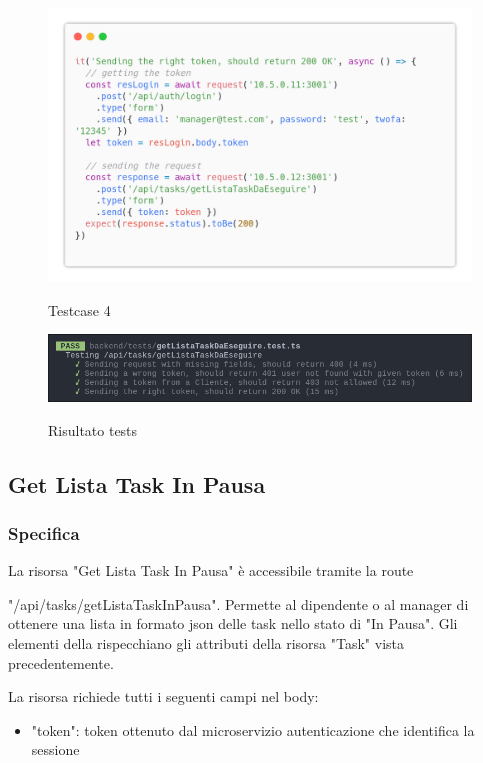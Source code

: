 \documentclass{report}
\begin{document}
\begin{figure}[H]
	\centering\includegraphics[width=1\textwidth]{images/code_da_eseguire_test4.png}

	Testcase 4
\end{figure}

\begin{figure}[H]
	\centering\includegraphics[width=1\textwidth]{images/jest_da_eseguire.png}

	Risultato tests
\end{figure}

\subsection{Get Lista Task In Pausa}
\subsubsection*{Specifica}


La risorsa "Get Lista Task In Pausa" è accessibile tramite la route

"/api/tasks/getListaTaskInPausa". Permette al dipendente o al manager di ottenere una lista in formato json delle task nello stato di "In Pausa". Gli elementi della rispecchiano gli attributi della risorsa "Task" vista precedentemente.

La risorsa richiede tutti i seguenti campi nel body:
\begin{itemize}
	\item "token": token ottenuto dal microservizio autenticazione che identifica la sessione
\end{itemize}
\end{document}
